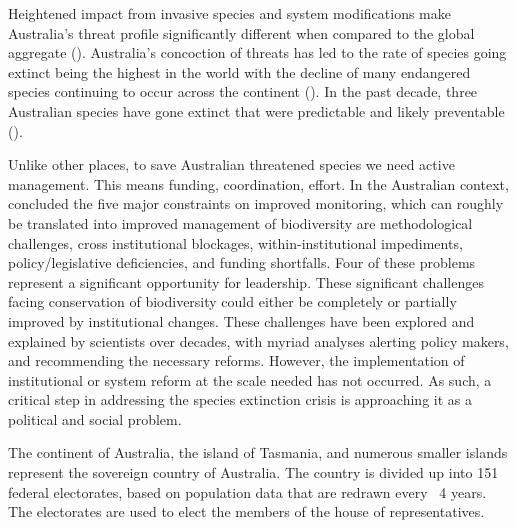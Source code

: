 \documentclass[a4paper,11pt]{article}
\begin{document}
Heightened impact from invasive species and system modifications make Australia's threat profile significantly different when compared to the global aggregate (\cite{kearneyThreatsAustraliaImperilled2019}). Australia's concoction of threats has led to the rate of species going extinct being the highest in the world with the decline of many endangered species continuing to occur across the continent (\cite{simmondsVulnerableSpeciesEcosystems2020}). In the past decade, three Australian species have gone extinct that were predictable and likely preventable (\cite{woinarskiContributionPolicyLaw2017}).

Unlike other places, to save Australian threatened species we need active management. This means funding, coordination, effort. 
In the Australian context, \cite{leggeMonitoringThreatenedSpecies2018} concluded the five major constraints on improved monitoring, which can roughly be translated into improved management of biodiversity are methodological challenges, cross institutional blockages, within-institutional impediments, policy/legislative deficiencies, and funding shortfalls. 
Four of these problems represent a significant opportunity for leadership. 
These significant challenges facing conservation of biodiversity could either be completely or partially improved by institutional changes. These challenges have been explored and explained by scientists over decades, with myriad analyses alerting policy makers, and recommending the necessary reforms. However, the implementation of institutional or system reform at the scale needed has not occurred. As such, a critical step in addressing the species extinction crisis is approaching it as a political and social problem. 

The continent of Australia, the island of Tasmania, and numerous smaller islands represent the sovereign country of Australia. The country is divided up into 151 federal electorates, based on population data that are redrawn every ~4 years. The electorates are used to elect the members of the house of representatives.
\end{document}
